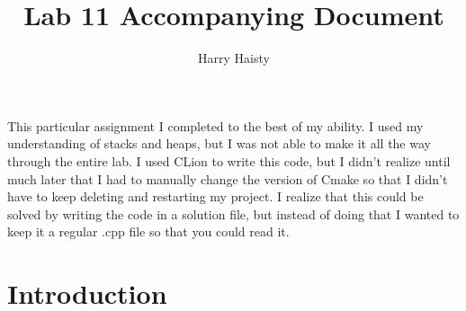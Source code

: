\documentclass[11pt]{article}
\title{Lab 11 Accompanying Document}
\author{Harry Haisty}
\date{}
\begin{document}
\maketitle

This particular assignment I completed to the best of my ability. I used my understanding of stacks and heaps, but I was not able to make it all the way through the entire lab. I used CLion to write this code, but I didn't realize until much later that I had to manually change the version of Cmake so that I didn't have to keep deleting and restarting my project. I realize that this could be solved by writing the code in a solution file, but instead of doing that I wanted to keep it a regular .cpp file so that you could read it. 

\section*{Introduction}
\end{document}
